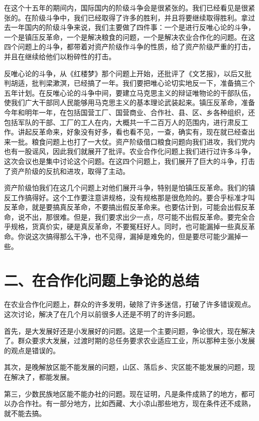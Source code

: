 在这个十五年的期间内，国际国内的阶级斗争会是很紧张的。我们已经看见是很紧张的。在阶级斗争中，我们已经取得了许多的胜利，并且将要继续取得胜利。拿过去一年国内的阶级斗争来说，我们主要做了四件事：一个是进行反唯心论的斗争，一个是镇压反革命，一个是解决粮食的问题，一个是解决农业合作化的问题。在这四个问题上的斗争，都带着对资产阶级作斗争的性质，给了资产阶级严重的打击，并且在继续给他们以粉碎性的打击。

反唯心论的斗争，从《红楼梦》那个问题上开始，还批评了《文艺报》，以后又批判胡适，批判梁漱溟，已经搞了一年。我们要把唯心论切实地反一下，准备搞三个五年计划。在反唯心论的斗争中间，要建立马克思主义的辩证唯物论的干部队伍，使我们广大干部同人民能够用马克思主义的基本理论武装起来。镇压反革命，准备今年和明年一年，在包括国营工厂、国营商业、合作社、县、区、乡各种组织，还包括军队的干部、工厂的工人在内，大概共一千二百万人的范围内，进行肃反工作。讲起反革命来，好象没有好多，看也看不见，一查，确实有，现在就已经查出来一批。粮食问题上也打了一大仗。资产阶级借口粮食问题向我们进攻，我们党内也有一股谣风，因此我们就展开了批评。农业合作化问题上我们进行过许多斗争，这次会议也是集中讨论这个问题。在这四个问题上，我们展开了巨大的斗争，打击了资产阶级的反抗和进攻，取得了主动。

资产阶级怕我们在这几个问题上对他们展开斗争，特别是怕镇压反革命。我们的镇反工作搞得好。这个工作要注意讲规格，没有规格那是很危险的。要合乎标准才叫反革命，就是要搞真反革命，不要搞出假反革命来。也要估计到，可能会出假反革命，说不出，那很难。但是，我们要求出少一点，尽可能不出假反革命。要完全合乎规格，货真价实，硬是真反革命，不要冤枉好人。同时，也可能漏掉一些真反革命。你说这次搞得那么干净，也不见得，漏掉是难免的，但是要尽可能少漏掉一些。

\section{二、在合作化问题上争论的总结}

在农业合作化问题上，群众的许多发明，破除了许多迷信，打破了许多错误观点。这次讨论，解决了在几个月以前很多人还是不明了的许多问题。

首先，是大发展好还是小发展好的问题。这是一个主要问题，争论很大，现在解决了。群众要求大发展，过渡时期的总任务要求农业适应工业，所以那种主张小发展的观点是错误的。

其次，是晚解放区能不能发展的问题，山区、落后乡、灾区能不能发展的问题，现在解决了，都能发展。

第三，少数民族地区能不能办社的问题。现在证明，凡是条件成熟了的地方，都可以办合作社。有一部分地方，比如西藏、大小凉山那些地方，现在条件还不成熟，就不能去搞。

